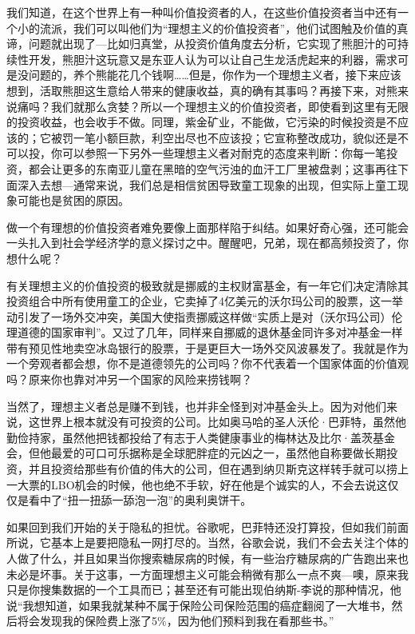 我们知道，在这个世界上有一种叫价值投资者的人，在这些价值投资者当中还有一个小的流派，我们可以叫他们为``理想主义的价值投资者''，他们试图触及价值的真谛，问题就出现了---比如归真堂，从投资价值角度去分析，它实现了熊胆汁的可持续性开发，熊胆汁这玩意又是东亚人认为可以让自己生龙活虎起来的利器，需求可是没问题的，养个熊能花几个钱啊\ldots{}\ldots{}但是，你作为一个理想主义者，接下来应该想到，活取熊胆这生意给人带来的健康收益，真的确有其事吗？再接下来，对熊来说痛吗？我们就那么贪婪？所以一个理想主义的价值投资者，即使看到这里有无限的投资收益，也会收手不做。同理，紫金矿业，不能做，它污染的时候投资是不应该的；它被罚一笔小额巨款，利空出尽也不应该投；它宣称整改成功，貌似还是不可以投，你可以参照一下另外一些理想主义者对耐克的态度来判断：你每一笔投资，都会让更多的东南亚儿童在黑暗的空气污浊的血汗工厂里被盘剥；这事再往下面深入去想---通常来说，我们总是相信贫困导致童工现象的出现，但实际上童工现象可能也是贫困的原因。

做一个有理想的价值投资者难免要像上面那样陷于纠结。如果好奇心强，还可能会一头扎入到社会学经济学的意义探讨之中。醒醒吧，兄弟，现在都高频投资了，你想什么呢？

有关理想主义的价值投资的极致就是挪威的主权财富基金，有一年它们决定清除其投资组合中所有使用童工的企业，它卖掉了4亿美元的沃尔玛公司的股票，这一举动引发了一场外交冲突，美国大使指责挪威这样做``实质上是对（沃尔玛公司）伦理道德的国家审判''。又过了几年，同样来自挪威的退休基金同许多对冲基金一样带有预见性地卖空冰岛银行的股票，于是更巨大一场外交风波暴发了。我就是作为一个旁观者都会想，你不是道德领先的公司吗？你不代表着一个国家体面的价值观吗？原来你也靠对冲另一个国家的风险来捞钱啊？

当然了，理想主义者总是赚不到钱，也并非全怪到对冲基金头上。因为对他们来说，这世界上根本就没有可投资的公司。比如奥马哈的圣人沃伦·巴菲特，虽然他勤俭持家，虽然他把钱都投给了有志于人类健康事业的梅林达及比尔·盖茨基金会，但他最爱的可口可乐据称是全球肥胖症的元凶之一，虽然他自称要做长期投资，并且投资给那些有价值的伟大的公司，但在遇到纳贝斯克这样转手就可以捞上一大票的LBO机会的时候，他也绝不手软，好在他是个诚实的人，不会去说这仅仅是看中了``扭一扭舔一舔泡一泡''的奥利奥饼干。

如果回到我们开始的关于隐私的担忧。谷歌呢，巴菲特还没打算投，但如我们前面所说，它基本上是要把隐私一网打尽的。当然，谷歌会说，我们不会去关注个体的人做了什么，并且如果当你搜索糖尿病的时候，有一些治疗糖尿病的广告跑出来也未必是坏事。关于这事，一方面理想主义可能会稍微有那么一点不爽---噢，原来我只是你搜集数据的一个工具而已；甚至还有可能出现伯纳斯-李说的那种情况，他说``我想知道，如果我就某种不属于保险公司保险范围的癌症翻阅了一大堆书，然后将会发现我的保险费上涨了5\%，因为他们预料到我在看那些书。''

